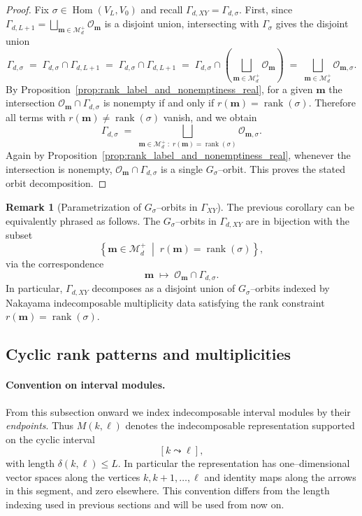 \documentclass{article}
\newcommand{\Hom}{\operatorname{Hom}}
\newcommand{\rank}{\operatorname{rank}}
\theoremstyle{definition}
\newtheorem{remark}[theorem]{Remark}
\begin{document}
\begin{proof}
Fix $\sigma\in\Hom(V_L,V_0)$ and recall $\Gamma_{d,XY}=\Gamma_{d,\sigma}$. First, since $\Gamma_{d,L+1}=\bigsqcup_{\mathbf m\in\mathcal M_d^+}\mathcal O_{\mathbf m}$ is a disjoint union,
intersecting with $\Gamma_\sigma$ gives the disjoint union
\[
\Gamma_{d,\sigma}
\;=\;
\Gamma_{d,\sigma}\cap \Gamma_{d,L+1}
\;=\;
\Gamma_{d,\sigma}\cap \Gamma_{d,L+1}
\;=\;
\Gamma_{d,\sigma} \cap \left(\bigsqcup_{\mathbf m\in\mathcal M_d^+}\mathcal O_{\mathbf m}\right)
\;=\;
\bigsqcup_{\mathbf m\in\mathcal M_d^+}\mathcal O_{\mathbf m, \sigma}.
\]
By Proposition~\ref{prop:rank_label_and_nonemptiness_real}, for a given $\mathbf m$ the intersection
$\mathcal O_{\mathbf m}\cap \Gamma_{d,\sigma}$ is nonempty if and only if
$r(\mathbf m)=\rank(\sigma)$. Therefore all terms with $r(\mathbf m)\neq\rank(\sigma)$ vanish,
and we obtain
\[
\Gamma_{d,\sigma}
\;=\;
\bigsqcup_{\mathbf m\in\mathcal M_d^+\;:\; r(\mathbf m)=\rank(\sigma)}
\mathcal O_{\mathbf m, \sigma}.
\]
Again by Proposition~\ref{prop:rank_label_and_nonemptiness_real}, whenever the intersection is nonempty,
$\mathcal O_{\mathbf m}\cap \Gamma_{d,\sigma}$ is a single $G_\sigma$--orbit. This proves the stated orbit
decomposition.
\end{proof}
\begin{remark}[Parametrization of $G_\sigma$--orbits in $\Gamma_{XY}$]
\label{rem:GammaXY_Gsigma_orbits}
The previous corollary can be equivalently phrased as follows.
The $G_\sigma$--orbits in $\Gamma_{d,XY}$ are in bijection with the subset
\[
\left\{\mathbf m\in \mathcal M_d^+ \;\middle|\; r(\mathbf m)=\rank(\sigma)\right\},
\]
via the correspondence
\[
\mathbf m
\;\longmapsto\;
\mathcal O_{\mathbf m}\cap \Gamma_{d,\sigma}.
\]
In particular, $\Gamma_{d,XY}$ decomposes as a disjoint union of $G_\sigma$--orbits indexed by
Nakayama indecomposable multiplicity data satisfying the rank constraint $r(\mathbf m)=\rank(\sigma)$.
\end{remark}
\subsection{Cyclic rank patterns and multiplicities}

\paragraph{Convention on interval modules.}
From this subsection onward we index indecomposable interval modules by
their \emph{endpoints}. Thus $M(k,\ell)$ denotes the indecomposable
representation supported on the cyclic interval
\[
[k\leadsto \ell],
\]
with length $\delta(k,\ell)\le L$. In particular the representation has
one--dimensional vector spaces along the vertices
$k,k+1,\dots,\ell$ and identity maps along the arrows in this segment,
and zero elsewhere. This convention differs from the length indexing
used in previous sections and will be used from now on.
\end{document}
